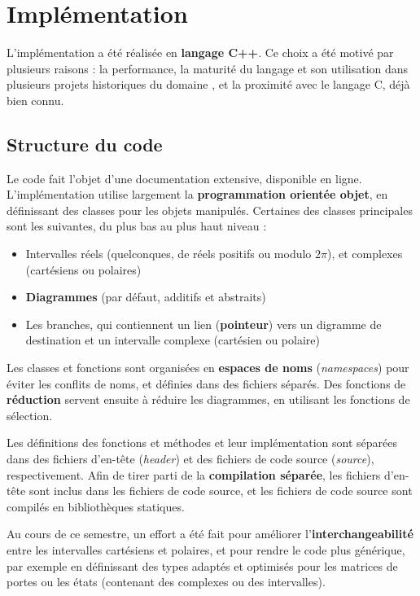 \chapter{Implémentation}
\label{ch:Implementation}

L’implémentation a été réalisée en \textbf{langage C++}. Ce choix a été motivé par plusieurs raisons : la performance, la maturité du langage et son utilisation dans plusieurs projets historiques du domaine \cite{Bichsel_2023} \cite{QTranslator}, et la proximité avec le langage C, déjà bien connu.

\section{Structure du code}

Le code fait l'objet d'une documentation extensive, disponible en ligne. \cite{Leroy_doc}
L'implémentation utilise largement la \textbf{programmation orientée objet}, en définissant des classes pour les objets manipulés.
Certaines des classes principales sont les suivantes, du plus bas au plus haut niveau :
\begin{itemize}
  \item Intervalles réels (quelconques, de réels positifs ou modulo $2\pi$), et complexes (cartésiens ou polaires)
  \item \textbf{Diagrammes} (par défaut, additifs et abstraits)
  \item Les branches, qui contiennent un lien (\textbf{pointeur}) vers un digramme de destination et un intervalle complexe (cartésien ou polaire)
\end{itemize}

Les classes et fonctions sont organisées en \textbf{espaces de noms} (\textit{namespaces}) pour éviter les conflits de noms, et définies dans des fichiers séparés. Des fonctions de \textbf{réduction} servent ensuite à réduire les diagrammes, en utilisant les fonctions de sélection.

Les définitions des fonctions et méthodes et leur implémentation sont séparées dans des fichiers d'en-tête (\textit{header}) et des fichiers de code source (\textit{source}), respectivement. Afin de tirer parti de la \textbf{compilation séparée}, les fichiers d'en-tête sont inclus dans les fichiers de code source, et les fichiers de code source sont compilés en bibliothèques statiques.

Au cours de ce semestre, un effort a été fait pour améliorer l'\textbf{interchangeabilité} entre les intervalles cartésiens et polaires, et pour rendre le code plus générique, par exemple en définissant des types adaptés et optimisés pour les matrices de portes ou les états (contenant des complexes ou des intervalles).

